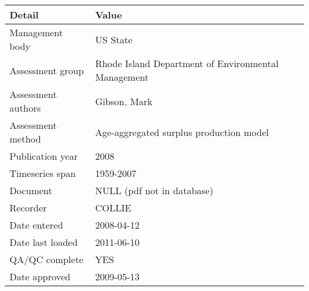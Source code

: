 \begin{table}[htb]
\centering
\begin{tabular}{lp{7cm}}
\toprule
Detail & Value \\
\midrule
Management body    & US State                                            \\
Assessment group   & Rhode Island Department of Environmental Management \\
Assessment authors & Gibson, Mark                                        \\
Assessment method  & Age-aggregated surplus production model             \\
Publication year   & 2008                                                \\
Timeseries span    & 1959-2007                                           \\
Document           & NULL (pdf not in database)                          \\
Recorder           & COLLIE                                              \\
Date entered       & 2008-04-12                                          \\
Date last loaded   & 2011-06-10                                          \\
QA/QC complete     & YES                                                 \\
Date approved      & 2009-05-13                                          \\
\bottomrule
\end{tabular}
\label{tab:assessdet}
\end{table}
